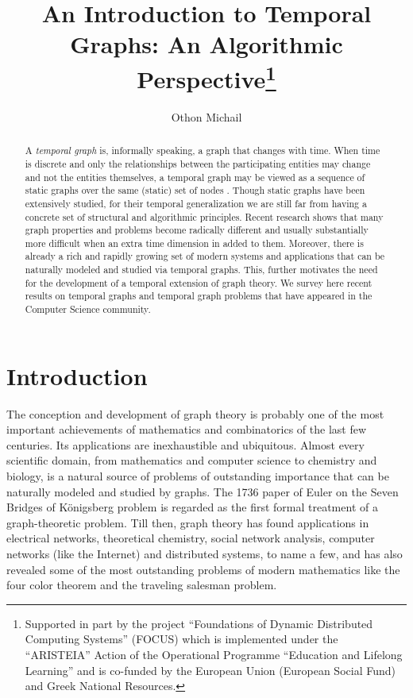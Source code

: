\documentclass[oribibl, 11pt]{llncs}
\title{An Introduction to Temporal Graphs: An Algorithmic Perspective\thanks{Supported in part by the project ``Foundations of Dynamic Distributed Computing Systems'' (\textsf{FOCUS}) which is implemented under the ``ARISTEIA'' Action of the  Operational Programme ``Education and Lifelong Learning'' and is co-funded by the European Union (European Social Fund) and Greek National Resources.}}
\author{Othon Michail}
\institute{Computer Technology Institute \& Press ``Diophantus'' (CTI),\\N. Kazantzaki Str., Patras University Campus,\\ Rio, P.O. Box 1382, 26504,\\Patras, Greece\\
Email:\email{ michailo@cti.gr}\\ Phone: +30 2610 960300}
\begin{document}
\maketitle

\begin{abstract}
A \emph{temporal graph} is, informally speaking, a graph that changes with time.  When time is discrete and only the relationships between the participating entities may change and not the entities themselves, a temporal graph may be viewed as a sequence  of static graphs over the same (static) set of nodes . Though static graphs have been extensively studied, for their temporal generalization we are still far from having a concrete set of structural and algorithmic principles. Recent research shows that many graph properties and problems become radically different and usually substantially more difficult when an extra time dimension in added to them. Moreover, there is already a rich and rapidly growing set of modern systems and applications that can be naturally modeled and studied via temporal graphs. This, further motivates the need for the development of a temporal extension of graph theory. We survey here recent results on temporal graphs and temporal graph problems that have appeared in the Computer Science community.
\end{abstract}

\section{Introduction}
\label{sec:intro}

The conception and development of graph theory is probably one of the most important achievements of mathematics and combinatorics of the last few centuries. Its applications are inexhaustible and ubiquitous. Almost every scientific domain, from mathematics and computer science to chemistry and biology, is a natural source of problems of outstanding importance that can be naturally modeled and studied by graphs. The 1736 paper of Euler on the Seven Bridges of K{\" o}nigsberg problem is regarded as the first formal treatment of a graph-theoretic problem. Till then, graph theory has found applications in electrical networks, theoretical chemistry, social network analysis, computer networks (like the Internet) and distributed systems, to name a few, and has also revealed some of the most outstanding problems of modern mathematics like the four color theorem and the traveling salesman problem.
\end{document}
